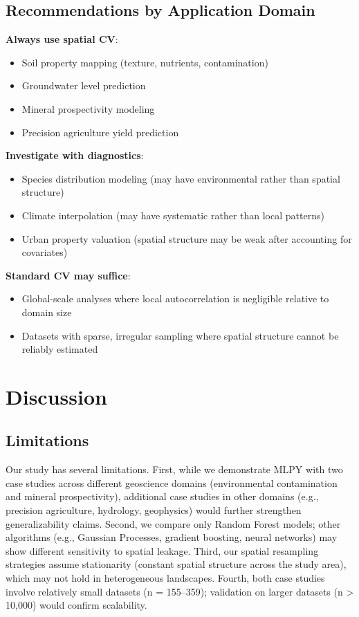 \documentclass[a4paper,fleqn]{cas-sc}
\begin{document}
\subsection{Recommendations by Application Domain}

\textbf{Always use spatial CV}:
\begin{itemize}
\item Soil property mapping (texture, nutrients, contamination)
\item Groundwater level prediction
\item Mineral prospectivity modeling
\item Precision agriculture yield prediction
\end{itemize}

\textbf{Investigate with diagnostics}:
\begin{itemize}
\item Species distribution modeling (may have environmental rather than spatial structure)
\item Climate interpolation (may have systematic rather than local patterns)
\item Urban property valuation (spatial structure may be weak after accounting for covariates)
\end{itemize}

\textbf{Standard CV may suffice}:
\begin{itemize}
\item Global-scale analyses where local autocorrelation is negligible relative to domain size
\item Datasets with sparse, irregular sampling where spatial structure cannot be reliably estimated
\end{itemize}


\section{Discussion}
\label{sec:discussion}

\subsection{Limitations}

Our study has several limitations. First, while we demonstrate MLPY with two case studies across different geoscience domains (environmental contamination and mineral prospectivity), additional case studies in other domains (e.g., precision agriculture, hydrology, geophysics) would further strengthen generalizability claims. Second, we compare only Random Forest models; other algorithms (e.g., Gaussian Processes, gradient boosting, neural networks) may show different sensitivity to spatial leakage. Third, our spatial resampling strategies assume stationarity (constant spatial structure across the study area), which may not hold in heterogeneous landscapes. Fourth, both case studies involve relatively small datasets (n = 155--359); validation on larger datasets (n > 10,000) would confirm scalability.
\end{document}
